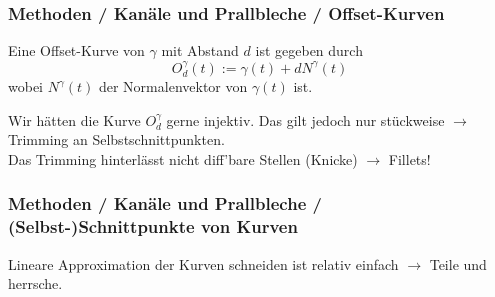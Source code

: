 \documentclass[8pt, aspectratio=169]{beamer}
\begin{document}
\begin{frame}
	\frametitle{Methoden / Kanäle und Prallbleche / Offset-Kurven}
	\vspace{-1cm}\hspace{-0.5cm}
	\begin{minipage}[t]{\textwidth}
		Eine Offset-Kurve von $\gamma$ mit Abstand $d$ ist gegeben durch
			$$ O^\gamma_d(t) := \gamma(t) + dN^\gamma(t)$$
		wobei $N^\gamma(t)$ der Normalenvektor von $\gamma(t)$ ist.
	\end{minipage}
	\begin{figure}[H]
		\centering
		\begin{subfigure}{0.49\textwidth}
			
		\end{subfigure}
		\begin{subfigure}{0.49\textwidth}
			
		\end{subfigure}
	\end{figure}
	\hspace{-0.5cm}
	\begin{minipage}[t]{\textwidth}
		Wir hätten die Kurve $O^\gamma_d$ gerne injektiv. Das gilt jedoch nur stückweise $\rightarrow$ Trimming an Selbstschnittpunkten.\\
		Das Trimming hinterlässt nicht diff'bare Stellen (Knicke) $\rightarrow$ Fillets!
	\end{minipage}
\end{frame}

\begin{frame}
	\frametitle{Methoden / Kanäle und Prallbleche / (Selbst-)Schnittpunkte von Kurven}
	\vspace{-0.5cm}\hspace{-0.5cm}
	\begin{minipage}[t]{\textwidth}
		Lineare Approximation der Kurven schneiden ist relativ einfach $\rightarrow$ Teile und herrsche.
		\begin{figure}[H]
			\centering
			
		\end{figure}
	\end{minipage}
\end{frame}
\end{document}
